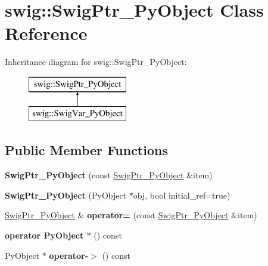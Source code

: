 \hypertarget{classswig_1_1SwigPtr__PyObject}{}\section{swig\+:\+:Swig\+Ptr\+\_\+\+Py\+Object Class Reference}
\label{classswig_1_1SwigPtr__PyObject}
Inheritance diagram for swig\+:\+:Swig\+Ptr\+\_\+\+Py\+Object\+:\begin{figure}[H]
\begin{center}
\leavevmode
\includegraphics[height=2.000000cm]{classswig_1_1SwigPtr__PyObject}
\end{center}
\end{figure}
\subsection*{Public Member Functions}
\begin{DoxyCompactItemize}
\item 
\mbox{\label{classswig_1_1SwigPtr__PyObject_a4282f20207f8cd22c9b079203c832a04}} 
{\bfseries Swig\+Ptr\+\_\+\+Py\+Object} (const \mbox{\hyperlink{classswig_1_1SwigPtr__PyObject}{Swig\+Ptr\+\_\+\+Py\+Object}} \&item)
\item 
\mbox{\label{classswig_1_1SwigPtr__PyObject_a4503d58d577d209f5e1fa67026852505}} 
{\bfseries Swig\+Ptr\+\_\+\+Py\+Object} (Py\+Object $\ast$obj, bool initial\+\_\+ref=true)
\item 
\mbox{\label{classswig_1_1SwigPtr__PyObject_a86d8657d6b4a27c8e9e6942bc1ba572c}} 
\mbox{\hyperlink{classswig_1_1SwigPtr__PyObject}{Swig\+Ptr\+\_\+\+Py\+Object}} \& {\bfseries operator=} (const \mbox{\hyperlink{classswig_1_1SwigPtr__PyObject}{Swig\+Ptr\+\_\+\+Py\+Object}} \&item)
\item 
\mbox{\label{classswig_1_1SwigPtr__PyObject_a488cefbaa1b44892dca63570d463f926}} 
{\bfseries operator Py\+Object $\ast$} () const
\item 
\mbox{\label{classswig_1_1SwigPtr__PyObject_abcd310284d78ccf1041fb60906bc115e}} 
Py\+Object $\ast$ {\bfseries operator-\/$>$} () const
\end{DoxyCompactItemize}
